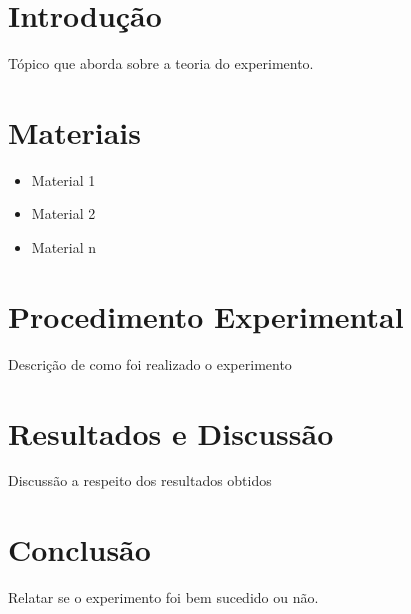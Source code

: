 \documentclass[a4paper, 12pt]{article}
\begin{document}
\section{Introdução}
	Tópico que aborda sobre a teoria do experimento.

\section{Materiais}
	\begin{itemize}
		\item Material 1
		\item Material 2
		\item Material n		
	\end{itemize}

\section{Procedimento Experimental}
	Descrição de como foi realizado o experimento

\section{Resultados e Discussão}
	Discussão a respeito dos resultados obtidos

\section{Conclusão}
	Relatar se o experimento foi bem sucedido ou não.

\noindent
\end{document}
